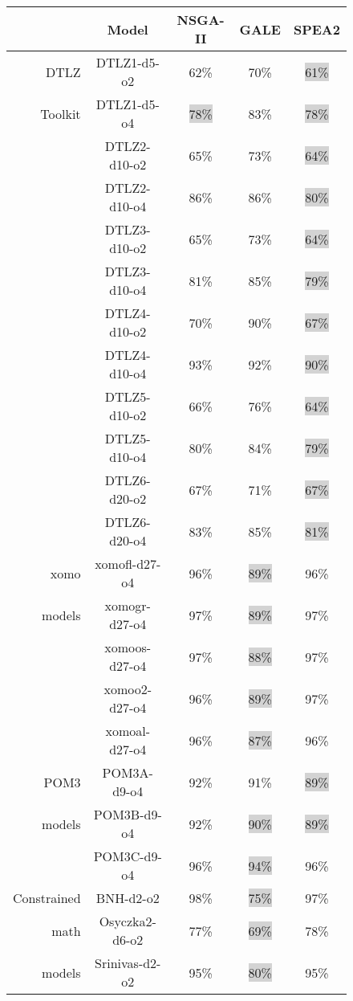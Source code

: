 \documentclass[10pt,journal,cspaper,compsoc]{IEEEtran}
\begin{document}
\begin{figure}
\scriptsize
\centering
\begin{tabular}{|r|c|c|c|c|} \hline
	&	Model	&	NSGA-II	&	GALE	&	SPEA2	\\ \hline
DTLZ	&	DTLZ1-d5-o2	&	62\%	&	70\%	&	\colorbox{lightgray}{61\%}	\\
Toolkit	&	DTLZ1-d5-o4	&	\colorbox{lightgray}{78\%}	&	83\%	&	\colorbox{lightgray}{78\%}	\\
	&	DTLZ2-d10-o2	&	65\%	&	73\%	&	\colorbox{lightgray}{64\%}	\\
	&	DTLZ2-d10-o4	&	86\%	&	86\%	&	\colorbox{lightgray}{80\%}	\\
	&	DTLZ3-d10-o2	&	65\%	&	73\%	&	\colorbox{lightgray}{64\%}	\\
	&	DTLZ3-d10-o4	&	81\%	&	85\%	&	\colorbox{lightgray}{79\%}	\\
	&	DTLZ4-d10-o2	&	70\%	&	90\%	&	\colorbox{lightgray}{67\%}	\\
	&	DTLZ4-d10-o4	&	93\%	&	92\%	&	\colorbox{lightgray}{90\%}	\\
	&	DTLZ5-d10-o2	&	66\%	&	76\%	&	\colorbox{lightgray}{64\%}	\\
	&	DTLZ5-d10-o4	&	80\%	&	84\%	&	\colorbox{lightgray}{79\%}	\\
	&	DTLZ6-d20-o2	&	67\%	&	71\%	&	\colorbox{lightgray}{67\%}	\\
	&	DTLZ6-d20-o4	&	83\%	&	85\%	&	\colorbox{lightgray}{81\%}	\\ \hline
xomo 	&	xomofl-d27-o4	&	96\%	&	\colorbox{lightgray}{89\%}	&	96\%	\\
models	&	xomogr-d27-o4	&	97\%	&	\colorbox{lightgray}{89\%}	&	97\%	\\
	&	xomoos-d27-o4	&	97\%	&	\colorbox{lightgray}{88\%}	&	97\%	\\
	&	xomoo2-d27-o4	&	96\%	&	\colorbox{lightgray}{89\%}	&	97\%	\\
	&	xomoal-d27-o4	&	96\%	&	\colorbox{lightgray}{87\%}	&	96\%	\\ \hline
POM3 	&	POM3A-d9-o4	&	92\%	&	91\%	&	\colorbox{lightgray}{89\%}	\\
models	&	POM3B-d9-o4	&	92\%	&	\colorbox{lightgray}{90\%}	&	\colorbox{lightgray}{89\%}	\\
	&	POM3C-d9-o4	&	96\%	&	\colorbox{lightgray}{94\%}	&	96\%	\\ \hline
Constrained	&	BNH-d2-o2	&	98\%	&	\colorbox{lightgray}{75\%}	&	97\%	\\
math	&	Osyczka2-d6-o2	&	77\%	&	\colorbox{lightgray}{69\%}	&	78\%	\\
models	&	Srinivas-d2-o2	&	95\%	&	\colorbox{lightgray}{80\%}	&	95\%	\\

\end{tabular}
\end{figure}
\end{document}
